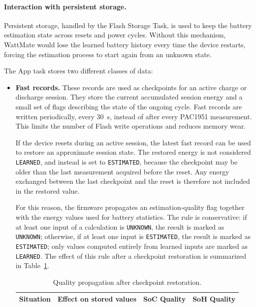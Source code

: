 \paragraph{Interaction with persistent storage.}
Persistent storage, handled by the Flash Storage Task, is used to keep the battery estimation state across resets and power cycles. Without this mechanism, WattMate would lose the learned battery history every time the device restarts, forcing the estimation process to start again from an unknown state.

The App task stores two different classes of data:

\begin{itemize}
	\item \textbf{Fast records.}
	These records are used as checkpoints for an active charge or discharge session. They store the current accumulated session energy and a small set of flags describing the state of the ongoing cycle. Fast records are written periodically, every \SI{30}{s}, instead of after every PAC1951 measurement. This limits the number of Flash write operations and reduces memory wear.
	
	If the device resets during an active session, the latest fast record can be used to restore an approximate session state. The restored energy is not considered \texttt{LEARNED}, and instead is set to \texttt{ESTIMATED}, because the checkpoint may be older than the last measurement acquired before the reset. Any energy exchanged between the last checkpoint and the reset is therefore not included in the restored value.
	
	For this reason, the firmware propagates an estimation-quality flag together with the energy values used for battery statistics. The rule is conservative: if at least one input of a calculation is \texttt{UNKNOWN}, the result is marked as \texttt{UNKNOWN}; otherwise, if at least one input is \texttt{ESTIMATED}, the result is marked as \texttt{ESTIMATED}; only values computed entirely from learned inputs are marked as \texttt{LEARNED}. The effect of this rule after a checkpoint restoration is summarized in Table~\ref{tab:checkpoint_quality_propagation}.
	
	
	\begin{table}[H]
		\centering
		\small
		\setlength{\tabcolsep}{4pt}
		\renewcommand{\arraystretch}{1.25}
		\caption{Quality propagation after checkpoint restoration.}
		\label{tab:checkpoint_quality_propagation}
		\begin{tabularx}{\textwidth}{
				@{}
				>{\raggedright\arraybackslash}p{}
				>{\raggedright\arraybackslash}X
				>{\raggedright\arraybackslash}p{3.5cm}
				>{\raggedright\arraybackslash}p{3.5cm}
				@{}
			}
			\toprule
			\textbf{Situation}					&
			\textbf{Effect on stored values}	&
			\textbf{SoC Quality} 				&
			\textbf{SoH Quality} 				\\
			\midrule
			

\end{tabularx}
\end{table}
\end{itemize}
